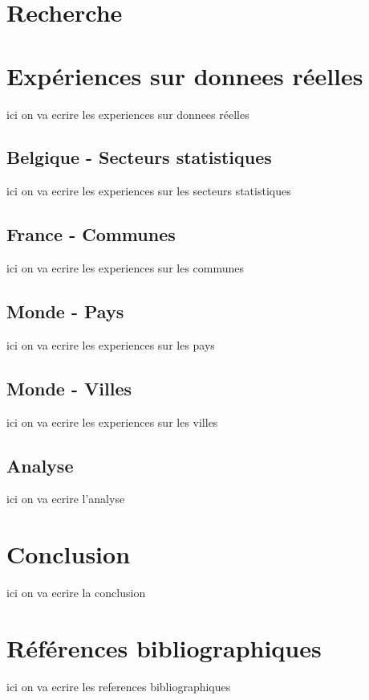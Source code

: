 \documentclass {article}
\begin{document}
\section {Recherche}\label{recherche}

\section {Expériences sur donnees réelles}
ici on va ecrire les experiences sur donnees réelles

\subsection {Belgique - Secteurs statistiques}
ici on va ecrire les experiences sur les secteurs statistiques

\subsection {France - Communes}
ici on va ecrire les experiences sur les communes

\subsection {Monde - Pays}
ici on va ecrire les experiences sur les pays

\subsection {Monde - Villes}
ici on va ecrire les experiences sur les villes

\subsection {Analyse}
ici on va ecrire l'analyse

\section {Conclusion}
ici on va ecrire la conclusion

\section {Références bibliographiques}
ici on va ecrire les references bibliographiques
\end{document}
